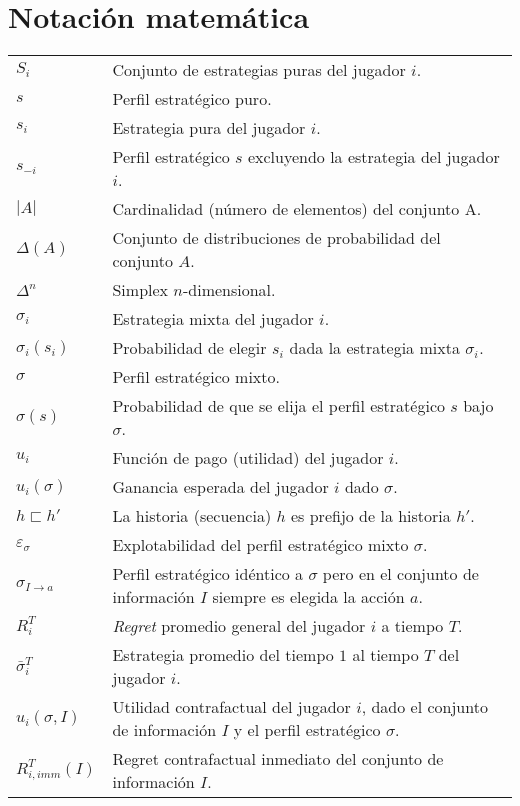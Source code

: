 \chapter*{Notación matemática}
\begingroup
\renewcommand{\arraystretch}{1.5}
\begin{tabular}{l p{12cm}}
$S_i$ & Conjunto de estrategias puras del jugador $i$. \\
$s$ & Perfil estratégico puro. \\
$s_i$ & Estrategia pura del jugador $i$. \\
$s_{-i}$ & Perfil estratégico $s$ excluyendo la estrategia del jugador $i$. \\
$|A|$ & Cardinalidad (número de elementos) del conjunto A. \\
$\Delta(A)$ & Conjunto de distribuciones de probabilidad del conjunto $A$. \\
$\Delta^n$ & Simplex $n$-dimensional. \\
$\sigma_i$ & Estrategia mixta del jugador $i$. \\
$\sigma_i(s_i)$ & Probabilidad de elegir $s_i$ dada la estrategia mixta $\sigma_i$. \\
$\sigma$ & Perfil estratégico mixto. \\
$\sigma(s)$ & Probabilidad de que se elija el perfil estratégico $s$ bajo $\sigma$. \\
$u_i$ & Función de pago (utilidad) del jugador $i$. \\
$u_i(\sigma)$ & Ganancia esperada del jugador $i$ dado $\sigma$. \\
$h \sqsubset h'$ & La historia (secuencia) $h$ es prefijo de la historia $h'$. \\ 
$\varepsilon_{\sigma}$ & Explotabilidad del perfil estratégico mixto $\sigma$. \\
$\sigma_{I \rightarrow a}$ & Perfil estratégico idéntico a $\sigma$ pero en el conjunto de información $I$ siempre es elegida la acción $a$. \\
$R_i^T$ & \textit{Regret} promedio general del jugador $i$ a tiempo $T$. \\
$\bar\sigma^T_i$ & Estrategia promedio del tiempo $1$ al tiempo $T$ del jugador $i$. \\
$u_i(\sigma, I)$ & Utilidad contrafactual del jugador $i$, dado el conjunto de información $I$ y el perfil estratégico $\sigma$. \\
$R^T_{i, imm}(I)$ & Regret contrafactual inmediato del conjunto de información $I$.
\end{tabular}
\endgroup

